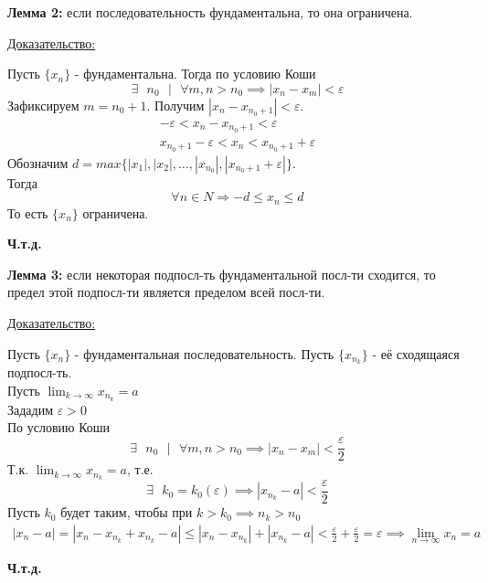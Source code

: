 \documentclass[12pt]{article}
\def\posl#1#2{\{#1_{#2}\}}
\begin{document}
    \noindent \textbf{Лемма 2:} если последовательность фундаментальна, то она ограничена.\par\noindent
    \underline{Доказательство:}\par
    \begin{adjustwidth}{1.5em}{1.5em}
        Пусть $\posl{x}{n}$ - фундаментальна. Тогда по условию Коши
        \[ \exists \text{ } n_0 \text{ } \big| \text{ } \forall m,n > n_0 \implies |x_n - x_m| < \varepsilon \]
        Зафиксируем $m = n_0 + 1$. Получим $|x_n - x_{n_0+1}| < \varepsilon$.
        \begin{gather*}
            -\varepsilon < x_n - x_{n_0 + 1} < \varepsilon\\
            x_{n_0 + 1} - \varepsilon < x_n <  x_{n_0 + 1} + \varepsilon
        \end{gather*}
        Обозначим $d = max\{|x_1|, |x_2|, \dots, |x_{n_0}|, |x_{n_0+1} + \varepsilon|\}$.\\
        Тогда
        \[ \forall n \in N \Rightarrow -d \le x_n \le d \]
        То есть $\posl{x}{n}$ ограничена.
        \begin{center}
            \textbf{Ч.т.д.}
        \end{center}
    \end{adjustwidth}

    \noindent \textbf{Лемма 3:} если некоторая подпосл-ть фундаментальной посл-ти сходится, то предел этой подпосл-ти является пределом всей посл-ти.\par\noindent
    \underline{Доказательство:}
    \begin{adjustwidth}{1.5em}{1.5em}
        Пусть $\posl{x}{n}$ - фундаментальная последовательность. Пусть $\posl{x}{n_k}$ - её сходящаяся подпосл-ть.\\
        Пусть $\lim_{k\to\infty}x_{n_k} = a$\\
        Зададим $\varepsilon > 0$\\
        По условию Коши
        \[ \exists \text{ } n_0 \text{ } \big| \text{ } \forall m,n > n_0 \implies |x_n - x_m| < \frac{\varepsilon}{2} \]
        Т.к. $\lim_{k\to\infty}x_{n_k} = a$, т.е.
        \[ \exists \text{ } k_0 = k_0(\varepsilon) \implies |x_{n_k} - a| < \frac{\varepsilon}{2} \]
        Пусть $k_0$ будет таким, чтобы при $k > k_0 \implies n_k > n_0$\\
        \begin{gather*}
            |x_n - a| = |x_n - x_{n_k} + x_{n_k} - a| \le |x_n - x_{n_k}| + |x_{n_k} - a| < \frac{\varepsilon}{2} + \frac{\varepsilon}{2} = \varepsilon \implies \lim_{n\to\infty} x_n = a
        \end{gather*}
        \begin{center}
            \textbf{Ч.т.д.}
        \end{center}
    \end{adjustwidth}
\end{document}
